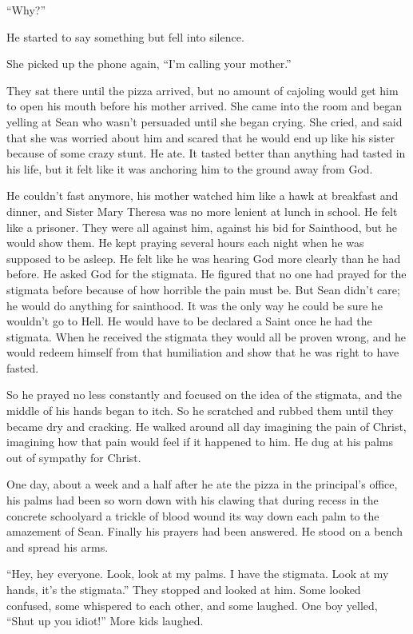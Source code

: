 \documentclass[12pt]{article}
\begin{document}
“Why?”

He started to say something but fell into silence.

She picked up the phone again, “I’m calling your mother.”

They sat there until the pizza arrived, but no amount of cajoling would get him to open his mouth before his mother arrived. She came into the room and began yelling at Sean who wasn’t persuaded until she began crying. She cried, and said that she was worried about him and scared that he would end up like his sister because of some crazy stunt. He ate. It tasted better than anything had tasted in his life, but it felt like it was anchoring him to the ground away from God.

He couldn’t fast anymore, his mother watched him like a hawk at breakfast and dinner, and Sister Mary Theresa was no more lenient at lunch in school. 
He felt like a prisoner. 
They were all against him, against his bid for Sainthood, but he would show them.
He kept praying several hours each night when he was supposed to be asleep.  
He felt like he was hearing God more clearly than he had before. 
He asked God for the stigmata. 
He figured that no one had prayed for the stigmata before because of how horrible the pain must be. 
But Sean didn’t care; he would do anything for sainthood. It was the only way he could be sure he wouldn’t go to Hell. 
He would have to be declared a Saint once he had the stigmata. 
When he received the stigmata they would all be proven wrong, and he would redeem himself from that humiliation and show that he was right to have fasted.

So he prayed no less constantly and focused on the idea of the stigmata, and the middle of his hands began to itch. 
So he scratched and rubbed them until they became dry and cracking. 
He walked around all day imagining the pain of Christ, imagining how that pain would feel if it happened to him. 
He dug at his palms out of sympathy for Christ.

One day, about a week and a half after he ate the pizza in the principal’s office, his palms had been so worn down with his clawing that during recess in the concrete schoolyard a trickle of blood wound its way down each palm to the amazement of Sean. Finally his prayers had been answered. 
He stood on a bench and spread his arms.

“Hey, hey everyone. Look, look at my palms. I have the stigmata. Look at my hands, it’s the stigmata.” 
They stopped and looked at him. 
Some looked confused, some whispered to each other, and some laughed. 
One boy yelled, “Shut up you idiot!” 
More kids laughed.
\end{document}
